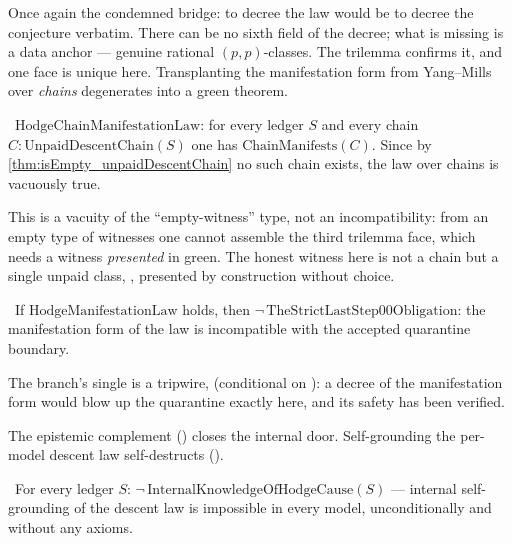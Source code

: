 Once again the condemned bridge: to decree the law would be to decree the conjecture verbatim. There
can be no sixth field of the decree; what is missing is a \red{} data anchor --- genuine rational
$(p,p)$-classes. The trilemma confirms it, and one face is unique here. Transplanting the
manifestation form from Yang--Mills over \emph{chains} degenerates into a green theorem.

\begin{theorem}\label{thm:hodgeChainManifestationLaw_green}
\green{}\ $\mathrm{HodgeChainManifestationLaw}$: for every ledger $S$ and every chain
$C:\mathrm{UnpaidDescentChain}(S)$ one has $\mathrm{ChainManifests}(C)$. Since by
\cref{thm:isEmpty_unpaidDescentChain} no such chain exists, the law over chains is vacuously true.
\end{theorem}

This is a vacuity of the ``empty-witness'' type, not an incompatibility: from an empty type of
witnesses one cannot assemble the third trilemma face, which needs a witness \emph{presented} in
green. The honest witness here is not a chain but a single unpaid class, ,
presented by construction without choice.

\begin{theorem}\label{thm:hodgeManifestationLaw_refutes_boundary}
\green{}\ If $\mathrm{HodgeManifestationLaw}$ holds, then
$\neg\,\mathrm{TheStrictLastStep00Obligation}$: the manifestation form of the law is incompatible
with the accepted quarantine boundary.
\end{theorem}

The branch's single \yellow{} is a tripwire,
 (conditional on \axiom{}): a
decree of the manifestation form would blow up the quarantine exactly here, and its safety has been
verified.

The epistemic complement () closes the internal door. Self-grounding
the per-model descent law self-destructs ().

\begin{theorem}\label{thm:hodgeCause_unknowable}
\green{}\ For every ledger $S$: $\neg\,\mathrm{InternalKnowledgeOfHodgeCause}(S)$ --- internal
self-grounding of the descent law is impossible in every model, unconditionally and without any
axioms.
\end{theorem}


